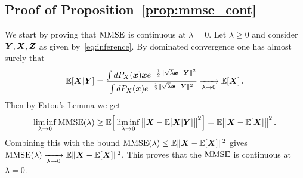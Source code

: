 \documentclass[12pt,nocut]{article}
\begin{document}
\subsection{Proof of Proposition~\ref{prop:mmse_cont}} \label{sec:proof_mmse_cont}
	We start by proving that ${{\rm MMSE}}$ is continuous at $\lambda = 0$.
	Let $\lambda\geq0$ and consider ${\boldsymbol Y},{\boldsymbol X},{\boldsymbol Z}$ as given by~\eqref{eq:inference}.
	By dominated convergence one has almost surely that 
	$$
	\mathbb{E}[{\boldsymbol X} | {\boldsymbol Y}]
	= 
	\frac{\int dP_X({\boldsymbol x}) {\boldsymbol x} e^{-\frac{1}{2}\| \sqrt{\lambda} {\boldsymbol x} - {\boldsymbol Y}\|^2}}{\int dP_X({\boldsymbol x}) e^{-\frac{1}{2}\| \sqrt{\lambda} {\boldsymbol x} - {\boldsymbol Y}\|^2}}
	\xrightarrow[\lambda \to 0]{} \mathbb{E}[{\boldsymbol X}] \,.
	$$
	Then by Fatou's Lemma we get
	$$
	\liminf_{\lambda \to 0} {{\rm MMSE}}(\lambda) \geq \mathbb{E} \Big[\liminf_{\lambda \to 0}
		\big\| {\boldsymbol X} - \mathbb{E}[{\boldsymbol X}| {\boldsymbol Y}] \big\|^2
	\Big] = \mathbb{E} \big\| {\boldsymbol X} - \mathbb{E}[{\boldsymbol X}] \big\|^2 \,.
	$$
	Combining this with the bound ${{\rm MMSE}}(\lambda) \leq \mathbb{E} \| {\boldsymbol X} - \mathbb{E}[{\boldsymbol X}]\|^2$ gives ${{\rm MMSE}}(\lambda) \xrightarrow[\lambda \to 0]{} \mathbb{E} \| {\boldsymbol X} -\mathbb{E}[{\boldsymbol X}]\|^2$. This proves that the ${{\rm MMSE}}$ is continuous at $\lambda=0$.
	\\
\end{document}
